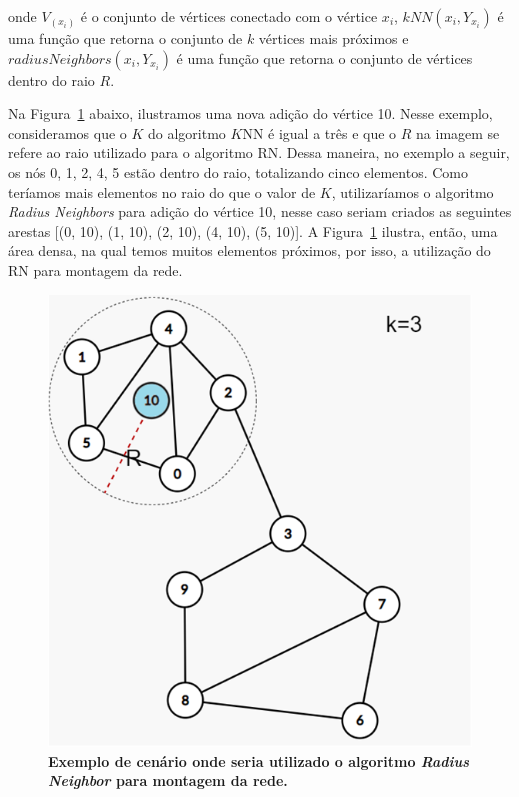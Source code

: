 \documentclass[
12pt,        %
oneside,     %
a4paper,     %
english,       %
brazil        %
%
%
]{ppgca}
\begin{document}
onde $V_(x_{i})$ é o conjunto de vértices conectado com o vértice $x_i$, $kNN (x_{i}, Y_{x_{i}})$ é uma função que retorna o conjunto de $k$ vértices mais próximos e $radiusNeighbors(x_{i}, Y_{x_{i}})$ é uma função que retorna o conjunto de vértices dentro do raio $R$.

Na Figura~\ref{fig:rn} abaixo, ilustramos uma nova adição do vértice 10. Nesse exemplo, consideramos que o $K$ do algoritmo $K$NN é igual a três e que o $R$ na imagem se refere ao raio utilizado para o algoritmo RN. Dessa maneira, no exemplo a seguir, os nós 0, 1, 2, 4, 5 estão dentro do raio, totalizando cinco elementos. Como teríamos mais elementos no raio do que o valor de $K$, utilizaríamos o algoritmo \textit{Radius Neighbors} para adição do vértice 10, nesse caso seriam criados as seguintes arestas [(0, 10), (1, 10), (2, 10), (4, 10), (5, 10)]. A Figura~\ref{fig:rn} ilustra, então, uma área densa, na qual temos muitos elementos próximos, por isso, a utilização do RN para montagem da rede.

\begin{figure}[H]
    \includegraphics[scale=0.6]{rn.png}
    \centering
    \caption{\textbf{Exemplo de cenário onde seria utilizado o algoritmo \textit{Radius Neighbor} para montagem da rede.}}
    \label{fig:rn}
\end{figure}
\end{document}
